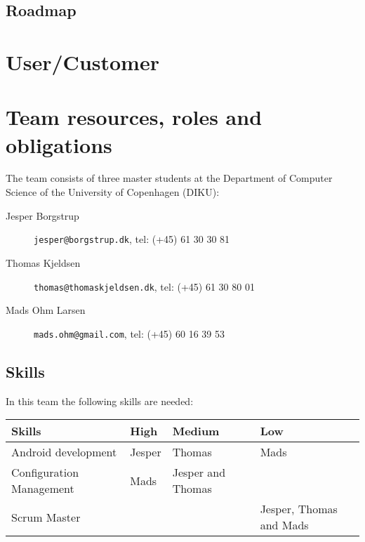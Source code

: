 \documentclass[a4paper,11pt]{article}
\begin{document}
\subsection{Roadmap} %
\label{subsec:roadmap}



\section{User/Customer} %
\label{sec:user_customer}


\section{Team resources, roles and obligations} %
\label{sec:team_resources_roles_and_obligations}
The team consists of three master students at the Department of Computer Science of the University of Copenhagen (DIKU): 

\begin{description}
\item[Jesper Borgstrup] {\tt jesper@borgstrup.dk}, tel: (+45) 61 30 30 81
\item[Thomas Kjeldsen] {\tt thomas@thomaskjeldsen.dk}, tel: (+45) 61 30 80 01
\item[Mads Ohm Larsen] {\tt mads.ohm@gmail.com}, tel: (+45) 60 16 39 53
\end{description}

\subsection{Skills} %
\label{subsec:skills}
In this team the following skills are needed:

\begin{tabular}{|p{4cm}|p{2cm}|p{3.5cm}|p{3.5cm}|}
\hline
\textbf{Skills}                   & \textbf{High}   & \textbf{Medium} & \textbf{Low} 					 \\\hline
Android development      & Jesper & Thomas & Mads 					 \\\hline
Configuration Management & Mads & Jesper and Thomas       &      					 \\\hline
Scrum Master             &        &        & Jesper, Thomas and Mads \\\hline 
\end{tabular}
\end{document}
